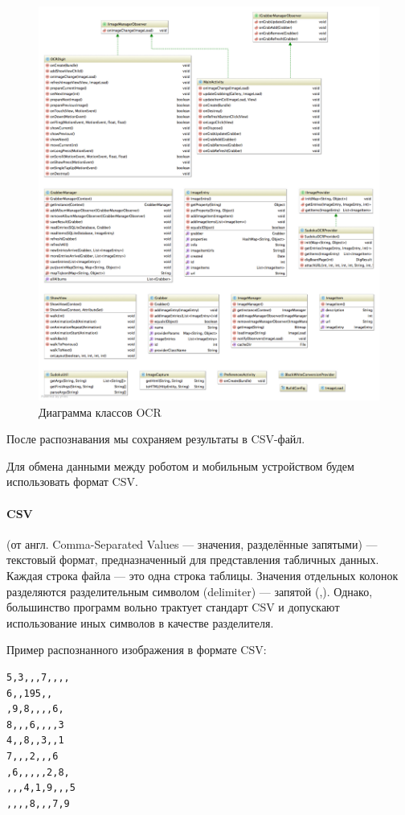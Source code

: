 \begin{figure}[ht]
  \centering
  \includegraphics[width=\textwidth]{inc/raster/design2-15.png}
  \caption{Диаграмма классов OCR}
  \label{fig:fig2100}
\end{figure}

После распознавания мы сохраняем результаты в CSV-файл.

Для обмена данными между роботом и мобильным устройством будем использовать формат CSV.

\paragraph{CSV} (от англ. Comma-Separated Values — значения, разделённые запятыми) — текстовый формат, предназначенный для представления табличных данных. Каждая строка файла — это одна строка таблицы. Значения отдельных колонок разделяются разделительным символом (delimiter) — запятой (,). Однако, большинство программ вольно трактует стандарт CSV и допускают использование иных символов в качестве разделителя. 

Пример распознанного изображения в формате CSV:
\begin{lstlisting}[caption=CSV файл с заданием]
5,3,,,7,,,,
6,,195,,
,9,8,,,,6,
8,,,6,,,,3
4,,8,,3,,1
7,,,2,,,6
,6,,,,,2,8,
,,,4,1,9,,,5
,,,,8,,,7,9
\end{lstlisting}

